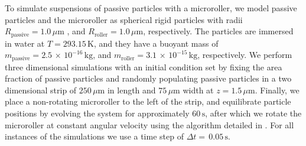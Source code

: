 \documentclass[12pt]{article}
\begin{document}
To simulate suspensions of passive particles with a microroller, we model passive particles and the microroller as spherical rigid particles with radii $R_\mathrm{passive} = 1.0 \, \mu \mathrm{m}$ , and $R_\mathrm{roller} = 1.0 \, \mu \mathrm{m}$, respectively. The particles are immersed in water at $T = 293.15 \, \mathrm{K}$, and they have a buoyant mass of $m_\mathrm{passive} = 2.5 \, \times \, 10^{-16} \, \mathrm{kg} $, and $m_\mathrm{roller} = 3.1 \, \times \, 10^{-15} \, \mathrm{kg}$, respectively. We perform three dimensional simulations with an initial condition set by fixing the area fraction of passive particles and randomly populating passive particles in a two dimensional strip of $250 \, \mu \mathrm{m}$ in length and $75 \, \mu \mathrm{m}$ width at $z = 1.5 \, \mu \mathrm{m}$. Finally, we place a non-rotating microroller to the left of the strip, and equilibrate particle positions by evolving the system for approximately $60 \, \mathrm{s}$, after which we rotate the microroller at constant angular velocity using the algorithm detailed in \cite{sprinkle_driven_2020}. For all instances of the simulations we use a time step of $\Delta t = \, 0.05 \, \mathrm{s}$. 
\end{document}
